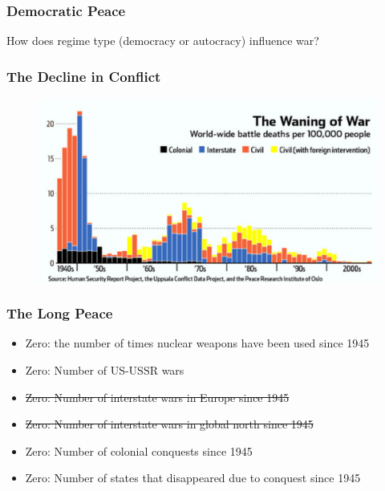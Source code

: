 \documentclass[handout]{beamer}
\begin{document}

\begin{frame} 
\frametitle{\LARGE{Democratic Peace}}
\centering 
\Large{
	How does regime type (democracy or autocracy) influence war? 
}
\end{frame}

\begin{frame} 
\frametitle{\LARGE{The Decline in Conflict}}
\begin{figure}[ht!]
	\centering
	\includegraphics[width=\textwidth,height=0.8\textheight,keepaspectratio]{./waning_war.png}
\end{figure}
\end{frame}

\begin{frame} 
\frametitle{\LARGE{The Long Peace}}
\begin{itemize}
		\item Zero: the number of times nuclear weapons have been used since 1945 \pause

		\item Zero: Number of US-USSR wars \pause

		\item \st{Zero: Number of interstate wars in Europe since 1945}

		\item \st{Zero: Number of interstate wars in global north since 1945}
\pause

		\item Zero: Number of colonial conquests since 1945
\pause

		\item Zero: Number of states that disappeared due to conquest since 1945
\end{itemize}
\end{frame}
\end{document}

